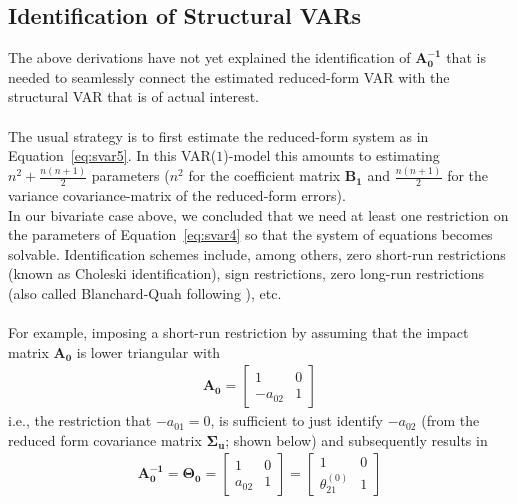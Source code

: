 \documentclass[a4paper,11pt,listof=nochaptergap,oneside,pointednumbers,bibtotoc,bigheadings,liststotoc]{scrbook}
\theoremstyle{mysatz}
\theoremstyle{mydefinition}
\theoremstyle{mybemerkung}
\newcommand{\vect}[1]{\boldsymbol{\mathbf{#1}}}
\begin{document}
\subsection{Identification of Structural VARs}
The above derivations have not yet explained the identification of $\vect{A_0^{-1}}$ that is needed to seamlessly connect the estimated reduced-form VAR with the structural VAR that is of actual interest. \\
\\
The usual strategy is to first estimate the reduced-form system as in Equation~\ref{eq:svar5}. In this VAR($1$)-model this amounts to estimating $n^2 + \frac{n(n+1)}{2}$ parameters ($n^2$ for the coefficient matrix $\vect{B_1}$ and $\frac{n(n+1)}{2}$ for the variance covariance-matrix of the reduced-form errors). 
\\
In our bivariate case above, we concluded that we need at least one restriction on the parameters of Equation~\ref{eq:svar4} so that the system of equations becomes solvable. Identification schemes include, among others, zero short-run restrictions (known as Choleski identification), sign restrictions, zero long-run restrictions (also called Blanchard-Quah following \citealp{blanchardandquah:89}), etc.\\
\\
For example, imposing a short-run restriction by assuming that the impact matrix $\vect{A_0}$ is lower triangular with
\begin{equation} \label{eq:svar11}
\begin{split}
 		\vect{A_0} = 	\begin{bmatrix}
    					1 & 0 \\
					-a_{02} & 1
 					\end{bmatrix}
\end{split}								
\end{equation}
i.e., the restriction that $-a_{01}=0$, is sufficient to just identify $-a_{02}$ (from the reduced form covariance matrix $\vect{\Sigma_u}$; shown below) and subsequently results in 
\begin{equation} \label{eq:svar12}
\begin{split}
 		\vect{A_0^{-1}} = \vect{\Theta_0} = 	
					\begin{bmatrix}
    					1 & 0 \\
					a_{02} & 1
 					\end{bmatrix} = 
						\begin{bmatrix}
    						1 & 0 \\
						\theta_{21}^{(0)} & 1
 						\end{bmatrix}
\end{split}								
\end{equation}
\end{document}
